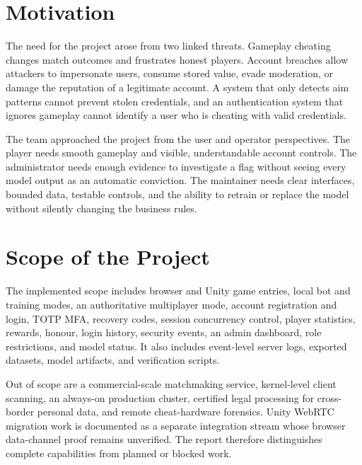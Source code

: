 \documentclass[12pt,a4paper,oneside]{report}
\begin{document}
\section{Motivation}
The need for the project arose from two linked threats. Gameplay cheating changes match outcomes and frustrates honest players. Account breaches allow attackers to impersonate users, consume stored value, evade moderation, or damage the reputation of a legitimate account. A system that only detects aim patterns cannot prevent stolen credentials, and an authentication system that ignores gameplay cannot identify a user who is cheating with valid credentials.

The team approached the project from the user and operator perspectives. The player needs smooth gameplay and visible, understandable account controls. The administrator needs enough evidence to investigate a flag without seeing every model output as an automatic conviction. The maintainer needs clear interfaces, bounded data, testable controls, and the ability to retrain or replace the model without silently changing the business rules.

\section{Scope of the Project}
The implemented scope includes browser and Unity game entries, local bot and training modes, an authoritative multiplayer mode, account registration and login, TOTP MFA, recovery codes, session concurrency control, player statistics, rewards, honour, login history, security events, an admin dashboard, role restrictions, and model status. It also includes event-level server logs, exported datasets, model artifacts, and verification scripts.

Out of scope are a commercial-scale matchmaking service, kernel-level client scanning, an always-on production cluster, certified legal processing for cross-border personal data, and remote cheat-hardware forensics. Unity WebRTC migration work is documented as a separate integration stream whose browser data-channel proof remains unverified. The report therefore distinguishes complete capabilities from planned or blocked work.
\end{document}
